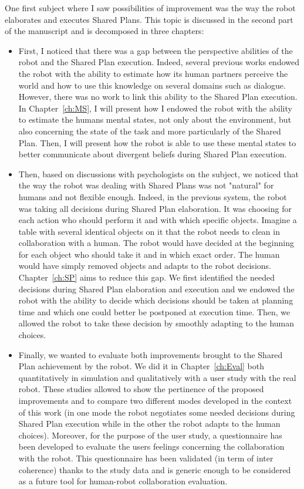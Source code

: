 \documentclass[english,a4paper,11pt,twoside]{StyleThese}
\begin{document}
One first subject where I saw possibilities of improvement was the way the robot elaborates and executes Shared Plans. This topic is discussed in the second part of the manuscript and is decomposed in three chapters:
\begin{itemize}
\item First, I noticed that there was a gap between the perspective abilities of the robot and the Shared Plan execution. Indeed, several previous works endowed the robot with the ability to estimate how its human partners perceive the world and how to use this knowledge on several domains such as dialogue. However, there was no work to link this ability to the Shared Plan execution. In Chapter~\ref{ch:MS}, I will present how I endowed the robot with the ability to estimate the humans mental states, not only about the environment, but also concerning the state of the task and more particularly of the Shared Plan. Then, I will present how the robot is able to use these mental states to better communicate about divergent beliefs during Shared Plan execution.
\item Then, based on discussions with psychologists on the subject, we noticed that the way the robot was dealing with Shared Plans was not "natural" for humans and not flexible enough. Indeed, in the previous system, the robot was taking all decisions during Shared Plan elaboration. It was choosing for each action who should perform it and with which specific objects. Imagine a table with several identical objects on it that the robot needs to clean in collaboration with a human. The robot would have decided at the beginning for each object who should take it and in which exact order. The human would have simply removed objects and adapts to the robot decisions. Chapter~\ref{ch:SP} aims to reduce this gap. We first identified the needed decisions during Shared Plan elaboration and execution and we endowed the robot with the ability to decide which decisions should be taken at planning time and which one could better be postponed at execution time. Then, we allowed the robot to take these decision by smoothly adapting to the human choices.
\item Finally, we wanted to evaluate both improvements brought to the Shared Plan achievement by the robot. We did it in Chapter~\ref{ch:Eval} both quantitatively in simulation and qualitatively with a user study with the real robot. These studies allowed to show the pertinence of the proposed improvements and to compare two different modes developed in the context of this work (in one mode the robot negotiates some needed decisions during Shared Plan execution while in the other the robot adapts to the human choices). Moreover, for the purpose of the user study, a questionnaire has been developed to evaluate the users feelings concerning the collaboration with the robot. This questionnaire has been validated (in term of inter coherence) thanks to the study data and is generic enough to be considered as a future tool for human-robot collaboration evaluation.
\end{itemize}
\end{document}
